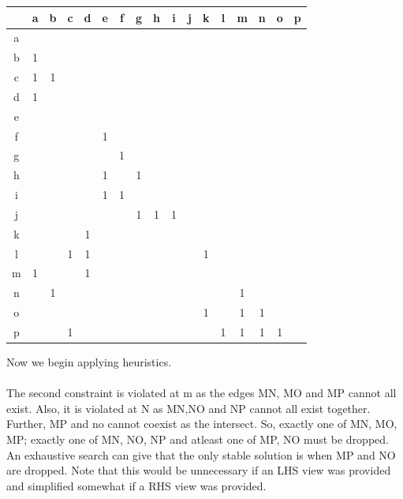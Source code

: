 \documentclass[
11pt, %
english, %
singlespacing, %
headsepline, %
]{MastersDoctoralThesis} %
\begin{document}
\begin{center}
\begin{tabular}[width = \textwidth]{ |c|c|c|c|c|c|c|c|c|c|c|c|c|c|c|c|c| } 
\hline
  & a & b & c & d & e & f & g & h & i & j & k & l & m & n & o & p \\ \hline \hline
a &   &   &   &   &   &   &   &   &   &   &   &   &   &   &   &   \\ \hline
b & 1 &   &   &   &   &   &   &   &   &   &   &   &   &   &   &   \\ \hline
c & 1 & 1 &   &   &   &   &   &   &   &   &   &   &   &   &   &   \\ \hline
d & 1 &   &   &   &   &   &   &   &   &   &   &   &   &   &   &   \\ \hline
e &   &   &   &   &   &   &   &   &   &   &   &   &   &   &   &   \\ \hline
f &   &   &   &   & 1 &   &   &   &   &   &   &   &   &   &   &   \\ \hline
g &   &   &   &   &   & 1 &   &   &   &   &   &   &   &   &   &   \\ \hline
h &   &   &   &   & 1 &   & 1 &   &   &   &   &   &   &   &   &   \\ \hline 
i &   &   &   &   & 1 & 1 &   &   &   &   &   &   &   &   &   &   \\ \hline
j &   &   &   &   &   &   & 1 & 1 & 1 &   &   &   &   &   &   &   \\ \hline
k &   &   &   & 1 &   &   &   &   &   &   &   &   &   &   &   &   \\ \hline
l &   &   & 1 & 1 &   &   &   &   &   &   & 1 &   &   &   &   &   \\ \hline
m & 1 &   &   & 1 &   &   &   &   &   &   &   &   &   &   &   &   \\ \hline
n &   & 1 &   &   &   &   &   &   &   &   &   &   & 1 &   &   &   \\ \hline
o &   &   &   &   &   &   &   &   &   &   & 1 &   & 1 & 1 &   &   \\ \hline
p &   &   & 1 &   &   &   &   &   &   &   &   & 1 & 1 & 1 & 1 &   \\ \hline
\hline
\end{tabular}
\end{center}
Now we begin applying heuristics.\\ \\
The second constraint is violated at m as the edges MN, MO and MP cannot all exist. Also, it is violated at N as MN,NO and NP cannot all exist together. Further, MP and no cannot coexist as the intersect. So, exactly one of MN, MO, MP; exactly one of MN, NO, NP and atleast one of MP, NO must be dropped. An exhaustive search can give that the only stable solution is when MP and NO are dropped. Note that this would be unnecessary if an LHS view was provided and simplified somewhat if a RHS view was provided. \\ \\
\end{document}

